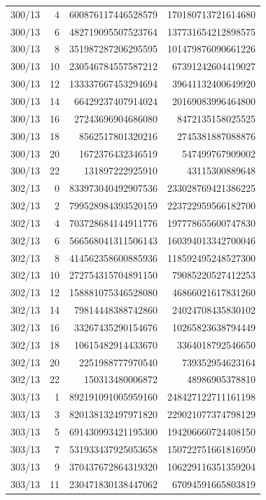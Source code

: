 \begin{longtable}{@{}rrrr@{}}
300/13 & 4 & 600876117446528579 & 170180713721614680\\
300/13 & 6 & 482719095507523764 & 137731654212898575\\
300/13 & 8 & 351987287206295595 & 101479876090661226\\
300/13 & 10 & 230546784557587212 & 67391242604419027\\
300/13 & 12 & 133337667453294694 & 39641132400649920\\
300/13 & 14 & 66429237407914024 & 20169083996464800\\
300/13 & 16 & 27243696904686080 & 8472135158025525\\
300/13 & 18 & 8562517801320216 & 2745381887088876\\
300/13 & 20 & 1672376432346519 & 547499767909002\\
300/13 & 22 & 131897222925910 & 43115300889648\\
302/13 & 0 & 833973040492907536 & 233028769421386225\\
302/13 & 2 & 799528984393520159 & 223722959566182700\\
302/13 & 4 & 703728684144911776 & 197778655600747830\\
302/13 & 6 & 566568041311506143 & 160394013342700046\\
302/13 & 8 & 414562358600885936 & 118592495248527300\\
302/13 & 10 & 272754315704891150 & 79085220527412253\\
302/13 & 12 & 158881075346528080 & 46866021617831260\\
302/13 & 14 & 79814448388742860 & 24024708435830102\\
302/13 & 16 & 33267435290154676 & 10265823638794449\\
302/13 & 18 & 10615482914433670 & 3364018792546650\\
302/13 & 20 & 2251988777970540 & 739352954623164\\
302/13 & 22 & 150313480006872 & 48986905378810\\
303/13 & 1 & 892191091005959160 & 248427122711161198\\
303/13 & 3 & 820138132497971820 & 229021077374798129\\
303/13 & 5 & 691430993421195300 & 194206660724408150\\
303/13 & 7 & 531933437925053658 & 150722751661816950\\
303/13 & 9 & 370437672864319320 & 106229116351359204\\
303/13 & 11 & 230471830138447062 & 67094591665803819\\

\end{longtable}
